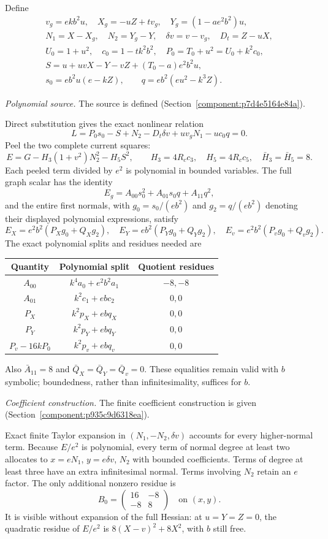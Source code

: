 Define
\begin{gather*}
v_g=ekb^2u,\quad X_g=-uZ+tv_g,\quad Y_g=(1-ae^2b^2)u,\\
N_1=X-X_g,\quad N_2=Y_g-Y,\quad \delta v=v-v_g,\quad D_t=Z-uX,\\
U_0=1+u^2,\quad c_0=1-tk^2b^2,\quad P_0=T_0+u^2=U_0+k^2c_0,\\
S=u+uvX-Y-vZ+(T_0-a)e^2b^2u,\\
s_0=eb^2u(e-kZ),\qquad q=eb^2(eu^2-k^3Z).
\end{gather*}
\par\noindent\textit{Polynomial source. }The source is defined (Section~\ref{component:p7d4e5164e84a}).\par
Direct substitution gives the exact nonlinear relation
\[
L=P_0s_0-S+N_2-D_t\delta v+uv_gN_1-uc_0q=0. \tag{E1}
\]
Peel the two complete current squares:
\[
E=G-H_3(1+v^2)N_2^2-H_5S^2,\qquad
H_3=4R_cc_3,\quad H_5=4R_cc_5,\quad \bar H_3=\bar H_5=8.
\]
Each peeled term divided by $e^2$ is polynomial in bounded variables. The full graph scalar has the identity
\[
E_g=A_{00}s_0^2+A_{01}s_0q+A_{11}q^2,
\]
and the entire first normals, with $g_0=s_0/(eb^2)$ and $g_2=q/(eb^2)$ denoting their displayed polynomial expressions, satisfy
\[
E_X=e^2b^2(P_Xg_0+Q_Xg_2),\quad
E_Y=eb^2(P_Yg_0+Q_Yg_2),\quad
E_v=e^2b^2(P_vg_0+Q_vg_2).
\]
The exact polynomial splits and residues needed are
\begin{center}\small
\begin{tabular}{ccc}\toprule
Quantity&Polynomial split&Quotient residues\\\midrule
$A_{00}$&$k^4a_0+e^2b^2a_1$&$-8,-8$\\
$A_{01}$&$k^2c_1+ebc_2$&$0,0$\\
$P_X$&$k^2p_X+ebq_X$&$0,0$\\
$P_Y$&$k^2p_Y+ebq_Y$&$0,0$\\
$P_v-16kP_0$&$k^2p_v+ebq_v$&$0,0$\\\bottomrule
\end{tabular}
\end{center}
Also $\bar A_{11}=8$ and $\bar Q_X=\bar Q_Y=\bar Q_v=0$. These equalities remain valid with $b$ symbolic; boundedness, rather than infinitesimality, suffices for $b$.

\par\noindent\textit{Coefficient construction. }The finite coefficient construction is given (Section~\ref{component:p935c9d6318ea}).\par

Exact finite Taylor expansion in $(N_1,-N_2,\delta v)$ accounts for every higher-normal term. Because $E/e^2$ is polynomial, every term of normal degree at least two allocates to $x=eN_1$, $y=e\delta v$, $N_2$ with bounded coefficients. Terms of degree at least three have an extra infinitesimal normal. Terms involving $N_2$ retain an $e$ factor. The only additional nonzero residue is
\[
B_0=\begin{pmatrix}16&-8\\-8&8\end{pmatrix}
\quad\text{on }(x,y).
\]
It is visible without expansion of the full Hessian: at $u=Y=Z=0$, the quadratic residue of $E/e^2$ is $8(X-v)^2+8X^2$, with $b$ still free.

